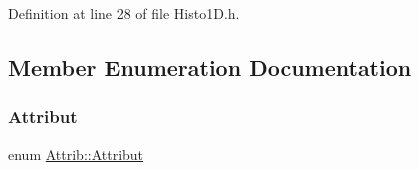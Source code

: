 Definition at line 28 of file Histo1\+D.\+h.



\subsection{Member Enumeration Documentation}
\mbox{\label{classAttrib_a69e171d7cc6417835a5a306d3c764235}} 
\subsubsection{\texorpdfstring{Attribut}{Attribut}}
{\footnotesize\ttfamily enum \hyperlink{classAttrib_a69e171d7cc6417835a5a306d3c764235}{Attrib\+::\+Attribut}\hspace{0.3cm}{\ttfamily [inherited]}}

